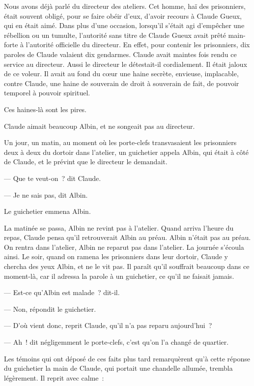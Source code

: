 \documentclass[french,twoside]{book} %
\begin{document}
Nous avons déjà parlé du directeur des ateliers. Cet homme, haï des prisonniers, était souvent obligé, pour se faire obéir d’eux, d’avoir recours à Claude Gueux, qui en était aimé. Dans plus d’une occasion, lorsqu’il s’était agi d’empêcher une rébellion ou un tumulte, l’autorité sans titre de Claude Gueux avait prêté main-forte à l’autorité officielle du directeur. En effet, pour contenir les prisonniers, dix paroles de Claude valaient dix gendarmes. Claude avait maintes  fois rendu ce service au directeur. Aussi le directeur le détestait-il cordialement. Il était jaloux de ce voleur. Il avait au fond du cœur une haine secrète, envieuse, implacable, contre Claude, une haine de souverain de droit à souverain de fait, de pouvoir temporel à pouvoir spirituel.\par
Ces haines-là sont les pires.\par
Claude aimait beaucoup Albin, et ne songeait pas au directeur.\par
Un jour, un matin, au moment où les porte-clefs transvasaient les prisonniers deux à deux du dortoir dans l’atelier, un guichetier appela Albin, qui était à côté de Claude, et le prévint que le directeur le demandait.\par
— Que te veut-on ? dit Claude.\par
— Je ne sais pas, dit Albin.\par
Le guichetier emmena Albin.\par
La matinée se passa, Albin ne revint pas à l’atelier. Quand arriva l’heure du repas, Claude pensa qu’il retrouverait Albin au préau. Albin n’était pas au préau. On rentra dans l’atelier, Albin ne reparut pas dans l’atelier. La journée s’écoula ainsi. Le soir, quand on ramena les prisonniers dans leur dortoir, Claude y chercha des yeux Albin, et ne le vit pas. Il paraît qu’il souffrait beaucoup dans ce moment-là, car il adressa la parole à un guichetier, ce qu’il ne faisait jamais.\par
— Est-ce qu’Albin est malade ? dit-il.\par
— Non, répondit le guichetier.\par
— D’où vient donc, reprit Claude, qu’il n’a pas reparu aujourd’hui ?\par
 — Ah ! dit négligemment le porte-clefs, c’est qu’on l’a changé de quartier.\par
Les témoins qui ont déposé de ces faits plus tard remarquèrent qu’à cette réponse du guichetier la main de Claude, qui portait une chandelle allumée, trembla légèrement. Il reprit avec calme :\par
\end{document}

